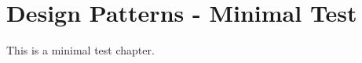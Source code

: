 \documentclass[../main.tex]{subfiles}
\begin{document}
\chapter{Design Patterns - Minimal Test}

This is a minimal test chapter.
\end{document}
